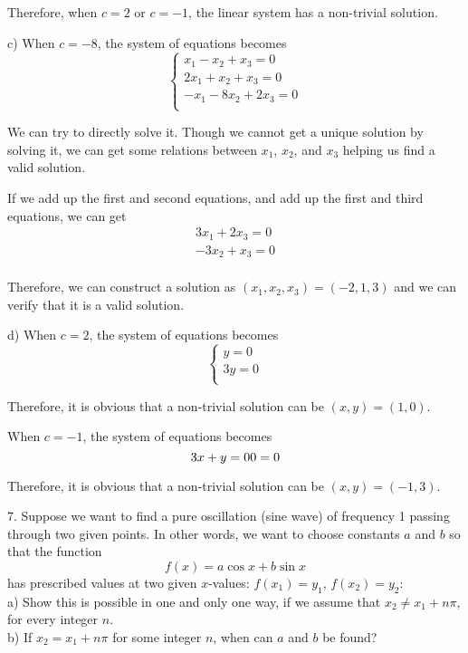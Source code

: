 \documentclass{article}
\begin{document}
Therefore, when $c = 2$ or $c = -1$, the linear system has a non-trivial 
solution.

c) 
When $c = -8$, the system of equations becomes
\begin{equation*}
  \begin{cases}
    x_1 - x_2 + x_3 = 0 \\
    2x_1 + x_2 + x_3 = 0 \\
    -x_1 - 8x_2 + 2x_3 = 0 \\
  \end{cases}
\end{equation*}

We can try to directly solve it. Though we cannot get a unique solution by 
solving it, we can get some relations between $x_1$, $x_2$, and $x_3$ helping 
us find a valid solution.

If we add up the first and second equations, and add up the first and third 
equations, we can get
\begin{gather*}
  3x_1 + 2x_3 = 0 \\
  -3x_2 + x_3 = 0 \\
\end{gather*}

Therefore, we can construct a solution as $(x_1, x_2, x_3) = (-2, 1, 3)$ and we 
can verify that it is a valid solution.

d)
When $c = 2$, the system of equations becomes
\begin{equation*}
  \begin{cases}
    y = 0 \\
    3y = 0 \\
  \end{cases}
\end{equation*}

Therefore, it is obvious that a non-trivial solution can be $(x, y) = (1, 0)$.

When $c = -1$, the system of equations becomes
\begin{equation*}
  3x + y = 0 \\
  0 = 0 \\
\end{equation*}

Therefore, it is obvious that a non-trivial solution can be $(x, y) = (-1, 3)$.

7. Suppose we want to find a pure oscillation (sine wave) of frequency 1 passing 
through two given points. In other words, we want to choose constants $a$ and 
$b$ so that the function 
\begin{equation*}
  f(x) = a\cos x + b\sin x
\end{equation*}
has prescribed values at two given $x$-values: $f(x_1) = y_1$, $f(x_2) = y_2$: \\
a) Show this is possible in one and only one way, if we assume that 
$x_2 \neq x_1 + n\pi$, for every integer $n$. \\
b) If $x_2 = x_1 + n\pi$ for some integer $n$, when can $a$ and $b$ be found?
\end{document}
